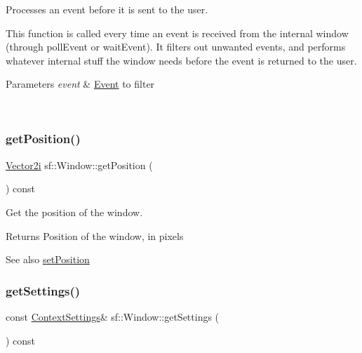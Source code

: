 Processes an event before it is sent to the user. 

This function is called every time an event is received from the internal window (through poll\+Event or wait\+Event). It filters out unwanted events, and performs whatever internal stuff the window needs before the event is returned to the user.


\begin{DoxyParams}{Parameters}
{\em event} & \mbox{\hyperlink{classsf_1_1_event}{Event}} to filter \begin{DoxyVerb}\end{DoxyVerb}
 \\
\hline
\end{DoxyParams}
\mbox{\label{classsf_1_1_window_a420028b8e4d9baedcaaba7b2047b8cb3}} 
\subsubsection{\texorpdfstring{getPosition()}{getPosition()}}
{\footnotesize\ttfamily \mbox{\hyperlink{classsf_1_1_vector2}{Vector2i}} sf\+::\+Window\+::get\+Position (\begin{DoxyParamCaption}{ }\end{DoxyParamCaption}) const}



Get the position of the window. 

\begin{DoxyReturn}{Returns}
Position of the window, in pixels
\end{DoxyReturn}
\begin{DoxySeeAlso}{See also}
\mbox{\hyperlink{classsf_1_1_window_a6c4078bfbf61c29bfc4b4732ce764f17}{set\+Position}} \begin{DoxyVerb}\end{DoxyVerb}
 
\end{DoxySeeAlso}
\mbox{\label{classsf_1_1_window_ae5b8065e92bbd0408e1fd8328e80d7d1}} 
\subsubsection{\texorpdfstring{getSettings()}{getSettings()}}
{\footnotesize\ttfamily const \mbox{\hyperlink{structsf_1_1_context_settings}{Context\+Settings}}\& sf\+::\+Window\+::get\+Settings (\begin{DoxyParamCaption}{ }\end{DoxyParamCaption}) const}



